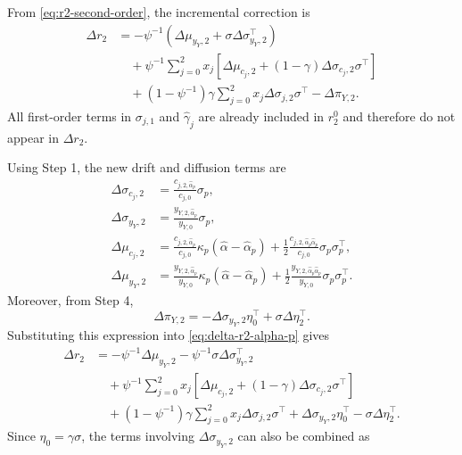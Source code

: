 From \eqref{eq:r2-second-order}, the incremental correction is
\begin{align}\label{eq:delta-r2-alpha-p}
    \Delta r_2
    &= -\psi^{-1}\left(\Delta\mu_{y_Y,2}+\sigma\Delta\sigma_{y_Y,2}^\top\right) 
\nonumber\\
    &\quad +\psi^{-1}\sum_{j=0}^2 x_j\left[
        \Delta\mu_{c_j,2}+(1-\gamma)\Delta\sigma_{c_j,2}\sigma^\top
    \right] \nonumber\\
    &\quad +(1-\psi^{-1})\gamma\sum_{j=0}^2 x_j
        \Delta\sigma_{j,2}\sigma^\top
    -\Delta\pi_{Y,2}.
\end{align}
All first-order terms in $\sigma_{j,1}$ and $\hat{\gamma}_j$ are already included in $r_2^{0}$ and therefore do not appear in $\Delta r_2$.

Using Step 1, the new drift and diffusion terms are
\begin{align}
    \Delta \sigma_{c_j,2}
    &=\frac{c_{j,2,\hat{\alpha}_p}}{c_{j,0}}\sigma_p,\\
    \Delta \sigma_{y_Y,2}
    &=\frac{y_{Y,2,\hat{\alpha}_p}}{y_{Y,0}}\sigma_p,\\
    \Delta \mu_{c_j,2}
    &=\frac{c_{j,2,\hat{\alpha}_p}}{c_{j,0}}\kappa_p(\hat{\alpha}-\hat{\alpha}_p)
    +\frac{1}{2}\frac{c_{j,2,\hat{\alpha}_p\hat{\alpha}_p}}{c_{j,0}}\sigma_p\sigma_p^\top,\\
    \Delta \mu_{y_Y,2}
    &=\frac{y_{Y,2,\hat{\alpha}_p}}{y_{Y,0}}\kappa_p(\hat{\alpha}-\hat{\alpha}_p)
    +\frac{1}{2}\frac{y_{Y,2,\hat{\alpha}_p\hat{\alpha}_p}}{y_{Y,0}}\sigma_p\sigma_p^\top.
\end{align}
Moreover, from Step 4,
\begin{equation}
    \Delta\pi_{Y,2}
    =-\Delta\sigma_{y_Y,2}\eta_0^\top+\sigma\Delta\eta_2^\top.
\end{equation}
Substituting this expression into \eqref{eq:delta-r2-alpha-p} gives
\begin{align}\label{eq:delta-r2-alpha-p-expanded}
    \Delta r_2
    &= -\psi^{-1}\Delta\mu_{y_Y,2}
    -\psi^{-1}\sigma\Delta\sigma_{y_Y,2}^\top 
\nonumber\\
    &\quad +\psi^{-1}\sum_{j=0}^2 x_j\left[
        \Delta\mu_{c_j,2}+(1-\gamma)\Delta\sigma_{c_j,2}\sigma^\top
    \right] 
\nonumber\\
    &\quad +(1-\psi^{-1})\gamma\sum_{j=0}^2 x_j
        \Delta\sigma_{j,2}\sigma^\top
    +\Delta\sigma_{y_Y,2}\eta_0^\top
    -\sigma\Delta\eta_2^\top.
\end{align}
Since $\eta_0=\gamma\sigma$, the terms involving $\Delta\sigma_{y_Y,2}$ can also be combined as
